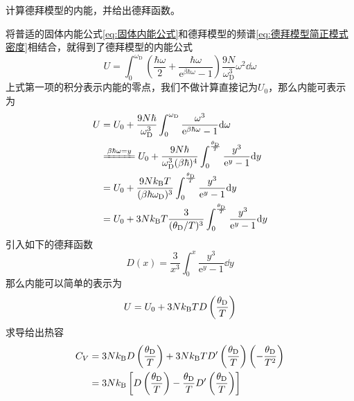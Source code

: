 \documentclass[../../main.tex]{subfiles}
\begin{document}
\begin{example}
    计算德拜模型的内能，并给出德拜函数。
    \begin{solution}
        将普适的固体内能公式\eqref{eq:固体内能公式}和德拜模型的频谱\eqref{eq:德拜模型简正模式密度}相结合，就得到了德拜模型的内能公式
        \begin{equation}
            U=\int_0^{\omega_{\mathrm{D}}}\left(\frac{\hbar\omega}{2}+\frac{\hbar\omega}{\mathrm{e}^{\beta\hbar\omega}-1}\right)\frac{9N}{\omega_{\mathrm{D}}^3}\omega^2\dd \omega
        \end{equation}
        上式第一项的积分表示内能的零点，我们不做计算直接记为\(U_0\)，那么内能可表示为
        \begin{equation}
            \begin{split}
                 U&=U_0+\frac{9N\hbar}{\omega_{\mathrm{D}}^3}\int_0^{\omega_{\mathrm{D}}}\frac{\omega^3}{\mathrm{e}^{\beta\hbar\omega}-1}\dd \omega \\
                 &\xlongequal{\beta\hbar\omega=y}U_0+\frac{9N\hbar}{\omega_{\mathrm{D}}^3(\beta\hbar)^4}\int_0^{\frac{\theta_{\mathrm{D}}}{T}}\frac{y^3}{\mathrm{e}^y-1}\dd y \\
                 &=U_0+\frac{9N\k T}{(\beta\hbar\omega_{\mathrm{D}})^3}\int_0^{\frac{\theta_{\mathrm{D}}}{T}}\frac{y^3}{\mathrm{e}^y-1}\dd y \\
                 &=U_0+3N\k T\frac{3}{(\theta_{\mathrm{D}}/T)^3}\int_0^{\frac{\theta_{\mathrm{D}}}{T}}\frac{y^3}{\mathrm{e}^y-1}\dd y
            \end{split}
        \end{equation}
        引入如下的德拜函数
        \begin{equation}
            D(x)=\frac{3}{x^3}\int_0^{x}\frac{y^3}{\mathrm{e}^y-1}\dd y
        \end{equation}
        那么内能可以简单的表示为
        \begin{equation}
            U=U_0+3Nk_{\mathrm{B}} TD\left(\frac{\theta_{\mathrm{D}}}{T}\right)
        \end{equation}
        求导给出热容
        \begin{equation}
            \begin{split}
                C_V&=3N\k D\left(\frac{\theta_{\mathrm{D}}}{T}\right)+3N\k TD'\left(\frac{\theta_{\mathrm{D}}}{T}\right)\left(-\frac{\theta_{\mathrm{D}}}{T^2}\right) \\
                &=3N\k\left[D\left(\frac{\theta_{\mathrm{D}}}{T}\right)-\frac{\theta_{\mathrm{D}}}{T}D'\left(\frac{\theta_{\mathrm{D}}}{T}\right)\right]

\end{split}
\end{equation}
\end{solution}
\end{example}
\end{document}
